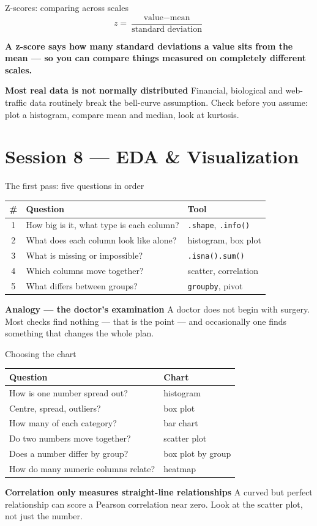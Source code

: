 \documentclass[10pt,aspectratio=169]{beamer}
\newcommand{\keyidea}[1]{%
  \begin{block}{}
  \centering\Large\bfseries\color{dsblue} #1
  \end{block}%
}
\newcommand{\trapbox}[2]{%
  \begin{alertblock}{\textbf{#1}}
  #2
  \end{alertblock}%
}
\newcommand{\analogybox}[2]{%
  \begin{exampleblock}{\textbf{Analogy --- #1}}
  #2
  \end{exampleblock}%
}
\begin{document}
\begin{frame}{Z-scores: comparing across scales}
\[ z = \frac{\text{value} - \text{mean}}{\text{standard deviation}} \]
\keyidea{A z-score says how many standard deviations a value sits from the mean --- so you can compare things measured on completely different scales.}
\trapbox{Most real data is not normally distributed}{Financial, biological and web-traffic data routinely break the bell-curve assumption. Check before you assume: plot a histogram, compare mean and median, look at kurtosis.}
\end{frame}

\section{Session 8 --- EDA \& Visualization}

\begin{frame}{The first pass: five questions in order}
\begin{table}
\small
\begin{tabularx}{\linewidth}{@{}cXl@{}}
\toprule
\# & \textbf{Question} & \textbf{Tool} \\
\midrule
1 & How big is it, what type is each column? & \texttt{.shape}, \texttt{.info()} \\
2 & What does each column look like alone? & histogram, box plot \\
3 & What is missing or impossible? & \texttt{.isna().sum()} \\
4 & Which columns move together? & scatter, correlation \\
5 & What differs between groups? & \texttt{groupby}, pivot \\
\bottomrule
\end{tabularx}
\end{table}
\analogybox{the doctor's examination}{A doctor does not begin with surgery. Most checks find nothing --- that is the point --- and occasionally one finds something that changes the whole plan.}
\end{frame}

\begin{frame}{Choosing the chart}
\begin{table}
\footnotesize
\begin{tabularx}{\linewidth}{@{}Xl@{}}
\toprule
\textbf{Question} & \textbf{Chart} \\
\midrule
How is one number spread out? & histogram \\
Centre, spread, outliers? & box plot \\
How many of each category? & bar chart \\
Do two numbers move together? & scatter plot \\
Does a number differ by group? & box plot by group \\
How do many numeric columns relate? & heatmap \\
\bottomrule
\end{tabularx}
\end{table}
\trapbox{Correlation only measures straight-line relationships}{A curved but perfect relationship can score a Pearson correlation near zero. Look at the scatter plot, not just the number.}
\end{frame}
\end{document}
